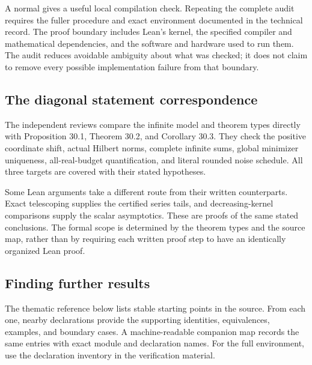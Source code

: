 \documentclass[11pt]{article}
\newcommand{\leanexpr}[1]{{\small\code{#1}}}
\begin{document}
A normal \leanexpr{lake build} gives a useful local compilation check. Repeating the complete audit requires the fuller procedure and exact environment documented in the technical record. The proof boundary includes Lean's kernel, the specified compiler and mathematical dependencies, and the software and hardware used to run them. The audit reduces avoidable ambiguity about what was checked; it does not claim to remove every possible implementation failure from that boundary.

\subsection{The diagonal statement correspondence}
The independent reviews compare the infinite model and theorem types directly with Proposition 30.1, Theorem 30.2, and Corollary 30.3. They check the positive coordinate shift, actual Hilbert norms, complete infinite sums, global minimizer uniqueness, all-real-budget quantification, and literal rounded noise schedule. All three targets are covered with their stated hypotheses.

Some Lean arguments take a different route from their written counterparts. Exact telescoping supplies the certified series tails, and decreasing-kernel comparisons supply the scalar asymptotics. These are proofs of the same stated conclusions. The formal scope is determined by the theorem types and the source map, rather than by requiring each written proof step to have an identically organized Lean proof.

\subsection{Finding further results}
The thematic reference below lists stable starting points in the source. From each one, nearby declarations provide the supporting identities, equivalences, examples, and boundary cases. A machine-readable companion map records the same entries with exact module and declaration names. For the full environment, use the declaration inventory in the verification material.

\end{document}
